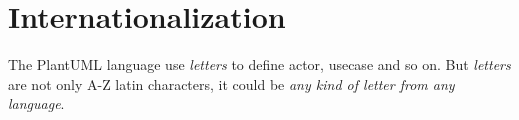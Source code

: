 %
%
% 
%
%
%
%
%
% 

\section{Internationalization}
\newfontfamily{}

The PlantUML language use \textit{letters} to define actor, usecase and so on. 
But \textit{letters} are not only A-Z latin characters, it could be \textit{any
kind of letter from any language}.

\vskip 10mm



